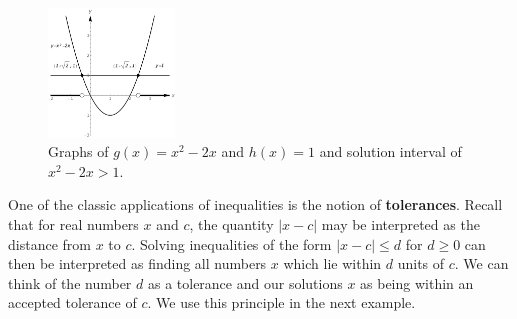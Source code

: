 \begin{example}
\begin{enumerate}
\begin{figure}[H]
    \begin{center}
			\includegraphics[width=0.3\textwidth]{fig_algebraic_5}
	\caption{Graphs of $g(x) = x^2-2x$ and $h(x)=1$ and solution interval of $x^2 - 2x > 1$.}
	\label{fig_algebraic_5}
	\end{center}
\end{figure}


	
\end{enumerate}	
	
\end{example}
\fi

\ifcourse
One of the classic applications of inequalities is the notion of \textbf{tolerances}.  Recall that for real numbers $x$ and $c$, the quantity $|x-c|$ may be interpreted as the distance from $x$ to $c$.  Solving inequalities of the form $|x-c| \leq d$ for $d \geq 0$ can then be interpreted as finding all numbers $x$ which lie within $d$ units of $c$.  We can think of the number $d$ as a tolerance and our solutions $x$ as being within an accepted tolerance of $c$.  We use this principle in the next example.

